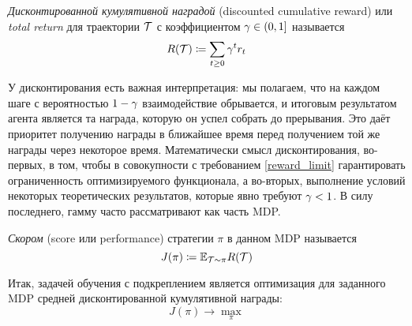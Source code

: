 \begin{definition}
\emph{Дисконтированной кумулятивной наградой} (discounted cumulative reward) или \emph{total return} для траектории $\mathcal{T}$ с коэффициентом $\gamma \HM\in (0, 1]$ называется
\begin{equation}\label{return}
R(\mathcal{T}) \coloneqq \sum_{t \ge 0} \gamma^t r_t
\end{equation}
\end{definition}

У дисконтирования есть важная интерпретация: мы полагаем, что на каждом шаге с вероятностью $1 \HM- \gamma$ взаимодействие обрывается, и итоговым результатом агента является та награда, которую он успел собрать до прерывания. Это даёт приоритет получению награды в ближайшее время перед получением той же награды через некоторое время. Математически смысл дисконтирования, во-первых, в том, чтобы в совокупности с требованием \eqref{reward_limit} гарантировать ограниченность оптимизируемого функционала, а во-вторых, выполнение условий некоторых теоретических результатов, которые явно требуют $\gamma \HM< 1$. В силу последнего, гамму часто рассматривают как часть MDP.

\begin{definition}
\emph{Скором} (score или performance) стратегии $\pi$ в данном MDP называется
\begin{equation}\label{goal}
J(\pi) \coloneqq \mathbb{E}_{\mathcal{T} \sim \pi} R(\mathcal{T})
\end{equation}
\end{definition}

Итак, задачей обучения с подкреплением является оптимизация для заданного MDP средней дисконтированной кумулятивной награды:
\begin{equation*}
J(\pi) \to \max_{\pi}
\end{equation*}

